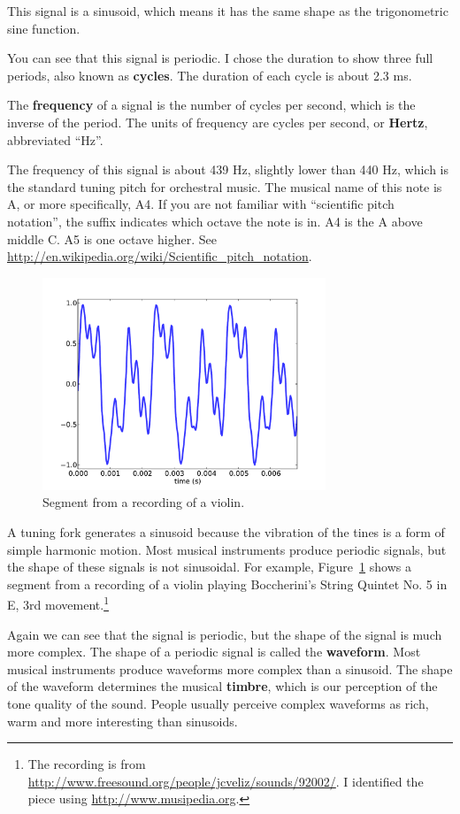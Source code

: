 \documentclass[12pt]{book}
\begin{document}
This signal is a sinusoid, which means it has the same shape as
the trigonometric sine function. 

You can see that this signal is periodic.  I chose the duration
to show three full periods, also known as {\bf cycles}.
The duration of each cycle is
about 2.3 ms.

The {\bf frequency} of a signal is the number of cycles
per second, which is the inverse of the period.
The units of frequency are cycles per second, or {\bf Hertz},
abbreviated ``Hz''.

The frequency of this signal is about 439 Hz, slightly lower than 440
Hz, which is the standard tuning pitch for orchestral music.  The
musical name of this note is A, or more specifically, A4.  If you are
not familiar with ``scientific pitch notation'', the suffix indicates
which octave the note is in.  A4 is the A above middle C.  A5 is one
octave higher.  See
\url{http://en.wikipedia.org/wiki/Scientific_pitch_notation}.

\begin{figure}
\centerline{\includegraphics[height=2.5in]{figs/violin1.pdf}}
\caption{Segment from a recording of a violin.}
\label{fig.violin1}
\end{figure}

A tuning fork generates a sinusoid because the vibration of the tines
is a form of simple harmonic motion.  Most musical instruments
produce periodic signals, but the shape of these signals is not
sinusoidal.  For example, Figure~\ref{fig.violin1} shows a segment
from a recording of a violin playing
Boccherini's String Quintet No. 5 in E, 3rd
movement.\footnote{The recording is from
  \url{http://www.freesound.org/people/jcveliz/sounds/92002/}.
I identified the piece using \url{http://www.musipedia.org}.}


Again we can see that the signal is periodic, but the shape of the
signal is much more complex.  The shape of a periodic signal is called
the {\bf waveform}.  Most musical instruments produce waveforms more
complex than a sinusoid.  The shape of the waveform determines the
musical {\bf timbre}, which is our perception of the tone quality of the
sound.  People usually perceive complex waveforms as rich, warm and
more interesting than sinusoids.
\end{document}
